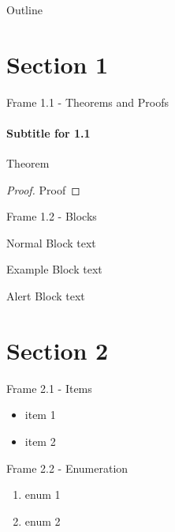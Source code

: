 \documentclass[xcolor=svgnames]{beamer}
\title[\shorttitle]{\maintitle}
\subtitle{\sbtitle}
\author[\sauthors]{\lauthors\\ \scriptsize{\em \home}}
\institute{\venue\\ \tiny{\location}}
\date[\sdate]{\scriptsize{\ldate}}
\begin{document}
\begin{frame}[plain]
	\titlepage
\end{frame}

\begin{frame}[plain]{Outline}
	\tableofcontents
\end{frame}

\section{Section 1}
\begin{frame}{Frame 1.1 - Theorems and Proofs}
	\framesubtitle{Subtitle for 1.1}
	\begin{theorem}
		Theorem
	\end{theorem}
	\begin{proof}
		Proof
	\end{proof}
\end{frame}

\begin{frame}{Frame 1.2 - Blocks}
	\begin{block}{Normal Block}
		text
	\end{block}
	
	\begin{exampleblock}{Example Block}
		text
	\end{exampleblock}
	
	\begin{alertblock}{Alert Block}
		text
	\end{alertblock}
\end{frame}

\section{Section 2}
\begin{frame}{Frame 2.1 - Items}
	\begin{itemize}
	\item item 1
	\item item 2
	\end{itemize}
\end{frame}

\begin{frame}{Frame 2.2 - Enumeration}
	\begin{enumerate}
	\item enum 1
	\item enum 2
	\end{enumerate}
\end{frame}
\end{document}
